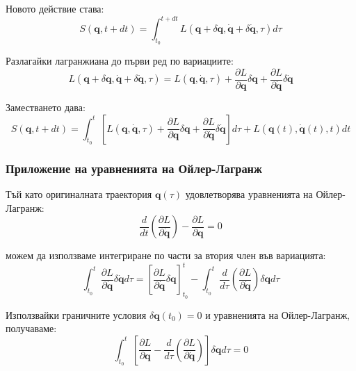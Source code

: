 \documentclass{report}
\begin{document}
Новото действие става:
\begin{equation}
S(\mathbf{q}, t + dt) = \int_{t_0}^{t+dt} L(\mathbf{q} + \delta\mathbf{q}, \dot{\mathbf{q}} + \delta\dot{\mathbf{q}}, \tau) d\tau
\end{equation}

Разлагайки лагранжиана до първи ред по вариациите:
\begin{equation}
L(\mathbf{q} + \delta\mathbf{q}, \dot{\mathbf{q}} + \delta\dot{\mathbf{q}}, \tau) = L(\mathbf{q}, \dot{\mathbf{q}}, \tau) + \frac{\partial L}{\partial \mathbf{q}} \delta\mathbf{q} + \frac{\partial L}{\partial \dot{\mathbf{q}}} \delta\dot{\mathbf{q}}
\end{equation}

Заместването дава:
\begin{equation}
S(\mathbf{q}, t + dt) = \int_{t_0}^{t} \left[ L(\mathbf{q}, \dot{\mathbf{q}}, \tau) + \frac{\partial L}{\partial \mathbf{q}} \delta\mathbf{q} + \frac{\partial L}{\partial \dot{\mathbf{q}}} \delta\dot{\mathbf{q}} \right] d\tau + L(\mathbf{q}(t), \dot{\mathbf{q}}(t), t) dt
\end{equation}

\subsubsection{Приложение на уравненията на Ойлер-Лагранж}
Тъй като оригиналната траектория $\mathbf{q}(\tau)$ удовлетворява уравненията на Ойлер-Лагранж:
\begin{equation}
\frac{d}{dt}\left(\frac{\partial L}{\partial \dot{\mathbf{q}}}\right) - \frac{\partial L}{\partial \mathbf{q}} = 0
\end{equation}

можем да използваме интегриране по части за втория член във вариацията:
\begin{equation}
\int_{t_0}^{t} \frac{\partial L}{\partial \dot{\mathbf{q}}} \delta\dot{\mathbf{q}} d\tau = \left[\frac{\partial L}{\partial \dot{\mathbf{q}}} \delta\mathbf{q}\right]_{t_0}^{t} - \int_{t_0}^{t} \frac{d}{d\tau}\left(\frac{\partial L}{\partial \dot{\mathbf{q}}}\right) \delta\mathbf{q} d\tau
\end{equation}

Използвайки граничните условия $\delta\mathbf{q}(t_0) = 0$ и уравненията на Ойлер-Лагранж, получаваме:
\begin{equation}
\int_{t_0}^{t} \left[\frac{\partial L}{\partial \mathbf{q}} - \frac{d}{d\tau}\left(\frac{\partial L}{\partial \dot{\mathbf{q}}}\right)\right] \delta\mathbf{q} d\tau = 0
\end{equation}
\end{document}
